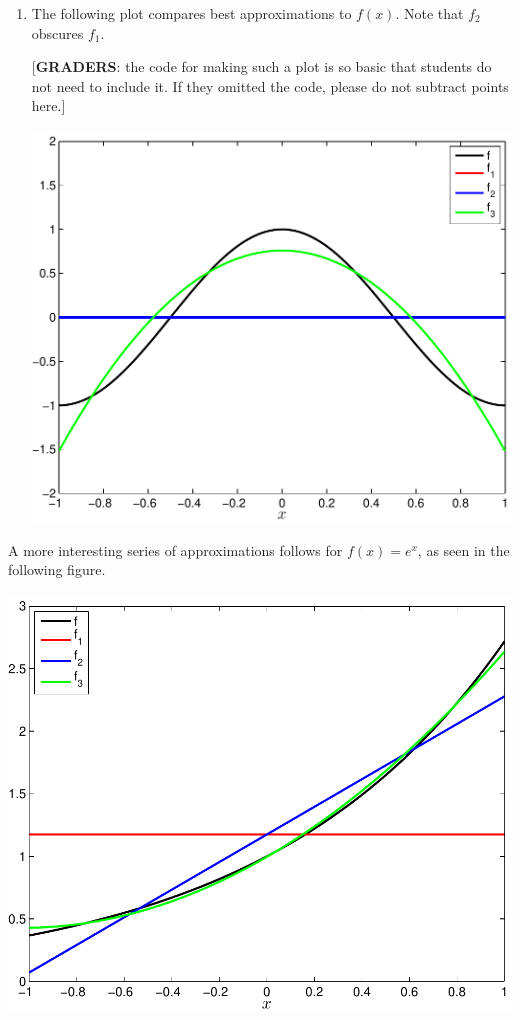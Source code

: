 {\begin{solution}
\begin{enumerate}
\item The following plot compares best approximations to $f(x)$.
Note that $f_2$ obscures $f_1$.

[\textbf{GRADERS}: the code for making such a plot is so basic that students
do not need to include it.  If they omitted the code, please do not subtract
points here.]

\begin{center} \includegraphics[scale=0.5]{legendre} \end{center}

\end{enumerate}
A more interesting series of approximations follows for $f(x) = e^x$, as 
seen in the following figure.
\begin{center} \includegraphics[scale=0.5]{legendre_exp} \end{center}

\end{solution}}{}

